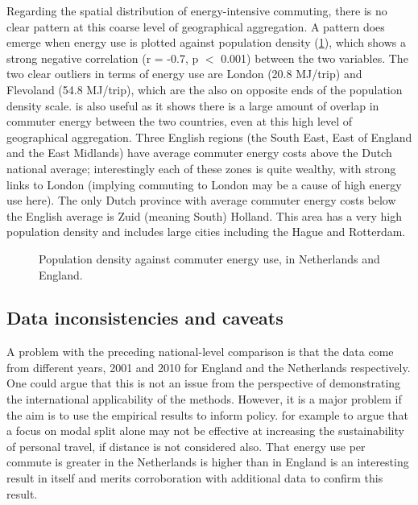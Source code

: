 Regarding the spatial distribution of energy-intensive commuting,
there is no clear pattern at this coarse level of geographical aggregation.
A pattern does emerge when energy use is plotted against
population density (\cref{fepdensnl}), which shows a strong negative correlation
(r = -0.7, p $<$ 0.001) between the two variables. The two clear outliers in
terms of energy use are London (20.8 MJ/trip) and Flevoland (54.8 MJ/trip),
which are the also on opposite ends of the population density scale.
 is also useful as it shows there is a large amount of
overlap in commuter energy between the two countries, even at this high
level of geographical aggregation. Three English regions
(the South East, East of England and the East Midlands) have average
commuter energy costs above the Dutch national average; interestingly
each of these zones is quite wealthy, with strong links to London
(implying commuting to London may be a cause of high energy use here).
The only Dutch province with average commuter energy costs below the
English average is Zuid (meaning South) Holland. This area has a very high
population density and includes large cities including the Hague and
Rotterdam.

\begin{figure}
 \caption[Population density against commuter energy use]
 {Population density against commuter energy use, in Netherlands and England.}
 \label{fepdensnl}
\end{figure}

\subsection{Data inconsistencies and caveats}
A problem with the preceding national-level comparison is that the
data come from different years, 2001 and 2010 for England and the Netherlands
respectively. One could argue that this is not an issue
from the perspective of demonstrating the international applicability of the
methods. However, it is a major problem if the aim is to use the empirical results
to inform policy.
for example to argue that a focus on modal split alone may not be  effective at
increasing the sustainability of personal travel, if distance is not considered
also. %
That energy use per commute is greater in the Netherlands is
higher than in England is an interesting result in itself and merits
corroboration with additional data to confirm this result.


